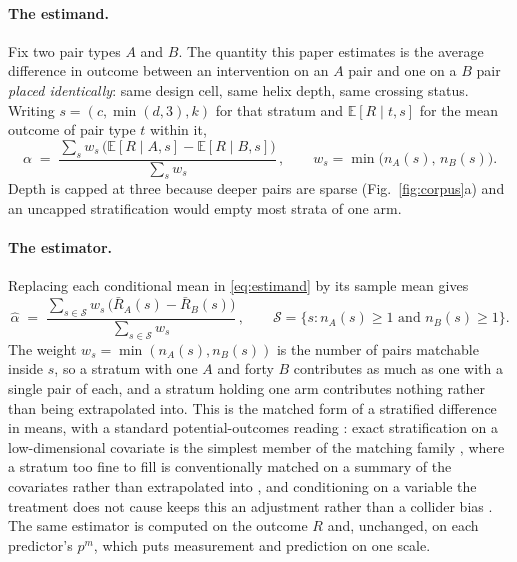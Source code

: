 \documentclass[11pt]{article}
\begin{document}
\paragraph{The estimand.} Fix two pair types $A$ and $B$. The quantity this paper estimates is
the average difference in outcome between an intervention on an $A$ pair and one on a $B$ pair
\emph{placed identically}: same design cell, same helix depth, same crossing status. Writing
$s=(c,\min(d,3),k)$ for that stratum and $\mathbb{E}[R\mid t,s]$ for the mean outcome of pair type
$t$ within it,
\begin{equation}
\alpha \;=\; \frac{\sum_{s} w_s\,\bigl(\mathbb{E}[R\mid A,s]-\mathbb{E}[R\mid B,s]\bigr)}
                 {\sum_{s} w_s}\,,
\qquad w_s=\min\bigl(n_A(s),\,n_B(s)\bigr).
\label{eq:estimand}
\end{equation}
Depth is capped at three because deeper pairs are sparse (Fig.~\ref{fig:corpus}a) and an uncapped
stratification would empty most strata of one arm.

\paragraph{The estimator.} Replacing each conditional mean in \eqref{eq:estimand} by its sample mean gives
\begin{equation}
\hat\alpha \;=\; \frac{\sum_{s\in\mathcal{S}} w_s\,\bigl(\bar R_A(s)-\bar R_B(s)\bigr)}
                        {\sum_{s\in\mathcal{S}} w_s}\,,
\qquad
\mathcal{S}=\{s: n_A(s)\ge 1 \text{ and } n_B(s)\ge 1\}.
\label{eq:est}
\end{equation}
The weight $w_s=\min(n_A(s),n_B(s))$ is the number of pairs matchable inside $s$, so a stratum
with one $A$ and forty $B$ contributes as much as one with a single pair of each, and a stratum
holding one arm contributes nothing rather than being extrapolated into. This is the matched form of a stratified difference in means, with a standard potential-outcomes
reading \citep{rubin1974estimating,imbens2015causal}: exact stratification on a
low-dimensional covariate is the simplest member of the matching family
\citep{cochran1965planning,rosenbaum1983central,rosenbaum1985constructing,ho2007matching,
stuart2010matching,austin2011introduction}, where a stratum too fine to fill is conventionally
matched on a summary of the covariates rather than extrapolated into
\citep{hansen2008prognostic,abadie2006large}, and conditioning on a variable the treatment does not
cause keeps this an adjustment rather than a collider bias \citep{greenland1999confounding}. The same estimator is computed on the outcome $R$ and, unchanged, on each predictor's $p^{m}$,
which puts measurement and prediction on one scale.
\end{document}
